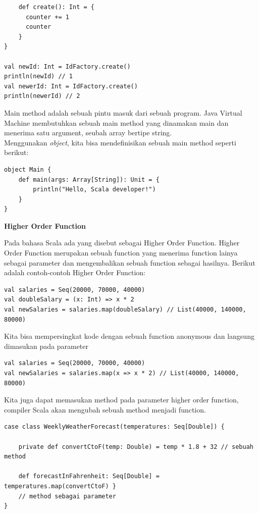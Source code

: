 \documentclass[a4paper,twoside]{article}
\begin{document}
\begin{enumerate}
\begin{verbatim}
    def create(): Int = {
      counter += 1
      counter
    }
}

val newId: Int = IdFactory.create()
println(newId) // 1
val newerId: Int = IdFactory.create()
println(newerId) // 2
\end{verbatim}

Main method adalah sebuah pintu masuk dari sebuah program. Java Virtual Machine membutuhkan sebuah main method yang dinamakan main dan menerima satu argument, seubah array bertipe string.\\

Menggunakan \textit{object}, kita bisa mendefinisikan sebuah main method seperti berikut: 

\begin{verbatim}
object Main {
    def main(args: Array[String]): Unit = {
        println("Hello, Scala developer!")
    }
}
\end{verbatim}

\textbf{Higher Order Function}

Pada bahasa Scala ada yang disebut sebagai Higher Order Function. Higher Order Function merupakan sebuah function yang menerima function lainya sebagai parameter dan mengembalikan sebuah function sebagai hasilnya. Berikut adalah contoh-contoh Higher Order Function:

\begin{verbatim}
val salaries = Seq(20000, 70000, 40000)
val doubleSalary = (x: Int) => x * 2
val newSalaries = salaries.map(doubleSalary) // List(40000, 140000, 80000)
\end{verbatim}

Kita bisa mempersingkat kode dengan sebuah function anonymous dan langsung dimasukan pada parameter

\begin{verbatim}
val salaries = Seq(20000, 70000, 40000)
val newSalaries = salaries.map(x => x * 2) // List(40000, 140000, 80000)
\end{verbatim}

Kita juga dapat memasukan method pada parameter higher order function, compiler Scala akan mengubah sebuah method menjadi function.


\begin{verbatim}
case class WeeklyWeatherForecast(temperatures: Seq[Double]) {

    private def convertCtoF(temp: Double) = temp * 1.8 + 32 // sebuah method

    def forecastInFahrenheit: Seq[Double] = temperatures.map(convertCtoF) } 
    // method sebagai parameter
}
\end{verbatim}



\end{enumerate}
\end{document}
